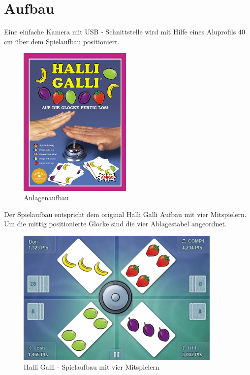 
\section{Aufbau}
\label{sec:Kapitel}

Eine einfache Kamera mit USB - Schnittstelle wird mit Hilfe eines Aluprofils 40 cm über dem Spielaufbau positioniert.

\begin{figure}[]
    \centering
    \includegraphics[width=5.5cm]{Abbildungen/cover}
    \caption[Anlage]{Anlagenaufbau}
    \label{fig:Anlage}
\end{figure}

Der Spielaufbau entspricht dem original Halli Galli Aufbau mit vier Mitspielern. Um die mittig positionierte Glocke sind die vier Ablagestabel angeordnet. 

\begin{figure}[h]
    \centering
    \includegraphics[width=10cm]{Abbildungen/Aufbau}
    \caption[Spielaufbau]{Halli Galli - Spielaufbau mit vier Mitspielern}
    \label{fig:Spielaufbau}
\end{figure}

